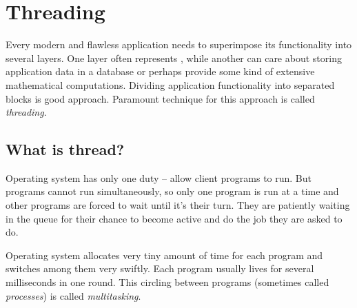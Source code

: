 \chapter{Threading}\label{section:thread}
Every modern and flawless application needs to superimpose its functionality into several layers. One layer often represents , while another can care about storing application data in a database or perhaps provide some kind of extensive mathematical computations. Dividing application functionality into separated blocks is good approach. Paramount technique for this approach is called \textit{threading}.

\section{What is thread?}
Operating system has only one duty -- allow client programs to run. But programs cannot run simultaneously, so only one program is run at a time and other programs are forced to wait until it's their turn. They are patiently waiting in the queue for their chance to become active and do the job they are asked to do. 

Operating system allocates very tiny amount of time for each program and switches among them very swiftly. Each program usually lives for several milliseconds in one round. This circling between programs (sometimes called \textit{processes}) is called \textit{multitasking}.

